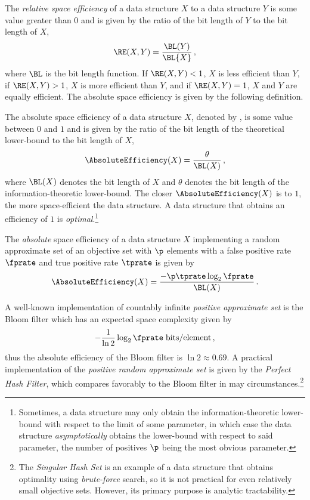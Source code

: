 \documentclass[ ../main.tex]{subfiles}
\begin{document}
The \emph{relative space efficiency} of a data structure $X$ to a data structure $Y$ is some value greater than $0$ and is given by the ratio of the bit length of $Y$ to the bit length of $X$,
\begin{equation}
    \RE(X,Y) = \frac{\BL(Y)}{\BL{X}}\,,
\end{equation}
where $\BL$ is the bit length function.
If $\RE(X,Y) < 1$, $X$ is less efficient than $Y$, if $\RE(X,Y) > 1$, $X$ is more efficient than $Y$, and if $\RE(X,Y) = 1$, $X$ and $Y$ are equally efficient.
The absolute space efficiency is given by the following definition.
\begin{definition}
The absolute space efficiency of a data structure $X$, denoted by , is some value between $0$ and $1$ and is given by the ratio of the bit length of the theoretical lower-bound to the bit length of $X$,
\begin{equation}
    \AbsoluteEfficiency(X) = \frac{\theta}{\BL(X)}\,,
\end{equation}
where $\BL(X)$ denotes the bit length of $X$ and $\theta$ denotes the bit length of the information-theoretic lower-bound.
The closer $\AbsoluteEfficiency(X)$ is to $1$, the more space-efficient the data structure.
A data structure that obtains an efficiency of $1$ is \emph{optimal}.\footnote{Sometimes, a data structure may only obtain the information-theoretic lower-bound with respect to the limit of some parameter, in which case the data structure \emph{asymptotically} obtains the lower-bound with respect to said parameter, the number of positives $\p$ being the most obvious parameter.}
\end{definition}

The \emph{absolute} space efficiency of a data structure $X$ implementing a random approximate set of an objective set with $\p$ elements with a false positive rate $\fprate$ and true positive rate $\tprate$ is given by
\begin{equation}
    \AbsoluteEfficiency(X) = \frac{-\p \tprate \log_2 \fprate}{\BL(X)}\,.
\end{equation}

A well-known implementation of countably infinite \emph{positive approximate set} is the Bloom filter\cite{bf} which has an expected space complexity given 
by
\begin{equation}
    -\frac{1}{\ln 2} \log_2 \fprate \; \si{bits \per element}\,,
\end{equation}
thus the absolute efficiency of the Bloom filter is $\ln 2 \approx 0.69$.
A practical implementation of the \emph{positive random approximate set} is given by the \emph{Perfect Hash Filter}\cite{phf}, which compares favorably to the Bloom filter in may circumstances.\footnote{The \emph{Singular Hash Set}\cite{shs} is an example of a data structure that obtains optimality using \emph{brute-force} search, so it is not practical for even relatively small objective sets. However, its primary purpose is analytic tractability.}
\end{document}
